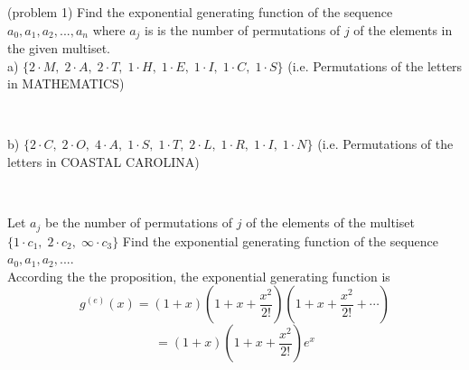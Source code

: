 \documentclass[handout]{ximera}
\begin{document}
\begin{problem}(problem 1)
Find the exponential generating function of the sequence $a_0, a_1, a_2, ..., a_{n}$ where $a_j$ is is the number of 
permutations of $j$ of the elements in the given multiset.\\
a) $\{2\cdot M,\; 2\cdot A,\; 2 \cdot T,\; 1\cdot H,\; 1\cdot E,\; 1\cdot I,\; 1\cdot C,\; 1\cdot S\}$ 
(i.e. Permutations of the letters in MATHEMATICS)
\begin{multipleChoice}
\\
\end{multipleChoice}



b) $\{2\cdot C,\; 2\cdot O,\; 4\cdot A,\; 1\cdot S,\; 1\cdot T,\; 2\cdot L,\; 1\cdot R,\; 1\cdot I,\; 1\cdot N\}$ 
(i.e. Permutations of the letters in COASTAL CAROLINA)
\begin{multipleChoice}
\\
\end{multipleChoice}

\end{problem}




\begin{example}[example 2]
Let $a_j$ be the number of permutations of $j$ of the elements of the multiset $\{1 \cdot c_1,\; 2 \cdot c_2,\; \infty \cdot c_3\}$
Find the exponential generating function of the sequence $a_0, a_1, a_2, ...$.\\
According the the proposition, the exponential generating function is
\[
g^{(e)}(x) = (1+x)\left(1 + x + \frac{x^2}{2!}\right)\left(1 + x + \frac{x^2}{2!} + \cdots \right)
\]
\[
= (1+x)\left(1 + x + \frac{x^2}{2!}\right)e^x
\]
\end{example}
\end{document}
